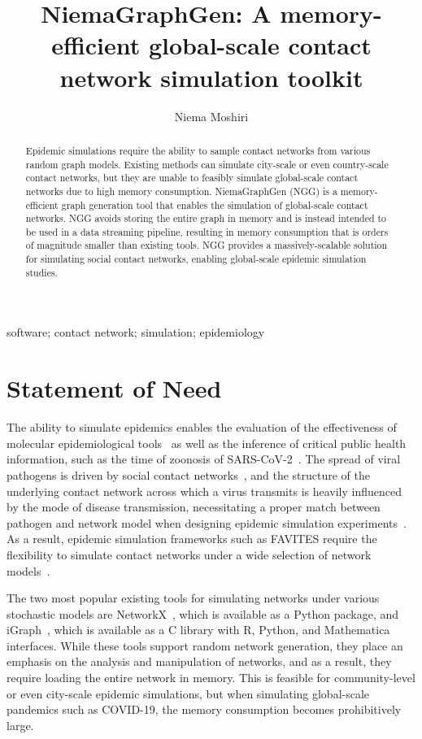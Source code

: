 \documentclass[a4paper,num-refs,gigabyte]{oup-contemporary}
\title{NiemaGraphGen: A memory-efficient global-scale contact network simulation toolkit}
\author[1,\authfn{1}]{Niema Moshiri}
\affil[1]{Department of Computer Science \& Engineering, UC San Diego, La Jolla, 92093, USA}
\begin{document}
\begin{frontmatter}
\maketitle
\begin{abstract}
Epidemic simulations require the ability to sample contact networks from various random graph models. Existing methods can simulate city-scale or even country-scale contact networks, but they are unable to feasibly simulate global-scale contact networks due to high memory consumption. NiemaGraphGen (NGG) is a memory-efficient graph generation tool that enables the simulation of global-scale contact networks. NGG avoids storing the entire graph in memory and is instead intended to be used in a data streaming pipeline, resulting in memory consumption that is orders of magnitude smaller than existing tools. NGG provides a massively-scalable solution for simulating social contact networks, enabling global-scale epidemic simulation studies.
\end{abstract}

\begin{keywords}
software; contact network; simulation; epidemiology
\end{keywords}
\end{frontmatter}

\section{Statement of Need}

The ability to simulate epidemics enables the evaluation of the effectiveness of molecular epidemiological tools~\cite{Moshiri2021} as well as the inference of critical public health information, such as the time of zoonosis of SARS-CoV-2~\cite{Pekar2021}. The spread of viral pathogens is driven by social contact networks~\cite{Kelly1991}, and the structure of the underlying contact network across which a virus transmits is heavily influenced by the mode of disease transmission, necessitating a proper match between pathogen and network model when designing epidemic simulation experiments~\cite{Craft2015}. As a result, epidemic simulation frameworks such as FAVITES require the flexibility to simulate contact networks under a wide selection of network models~\cite{Moshiri2018}.

The two most popular existing tools for simulating networks under various stochastic models are NetworkX~\cite{Hagberg2008}, which is available as a Python package, and iGraph~\cite{Csardi2006}, which is available as a C library with R, Python, and Mathematica interfaces. While these tools support random network generation, they place an emphasis on the analysis and manipulation of networks, and as a result, they require loading the entire network in memory. This is feasible for community-level or even city-scale epidemic simulations, but when simulating global-scale pandemics such as COVID-19, the memory consumption becomes prohibitively large.
\end{document}
